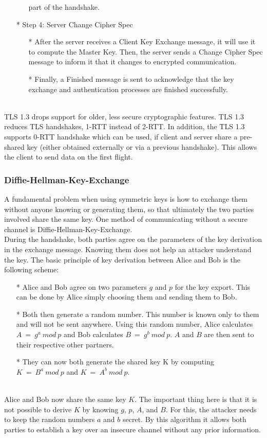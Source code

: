 \begin{enumerate}[]
\begin{enumerate}[]
            part of the handshake.
        \end{enumerate}
    \item[*] Step 4: Server Change Cipher Spec
        \begin{enumerate}[]
            \item[*] After the server receives a Client Key Exchange message, it will use 
            it to compute the Master Key. Then, the server sends a Change Cipher Spec message 
            to inform it that it changes to encrypted communication.
            \item[*] Finally, a Finished message is sent to acknowledge that the key exchange 
            and authentication processes are finished successfully.
        \end{enumerate}
\end{enumerate}
\\
TLS 1.3 drops support for older, less secure cryptographic features. TLS 1.3 reduces 
TLS handshakes, 1-RTT instead of 2-RTT. In addition, the TLS 1.3 supports 0-RTT handshake 
which can be used, if client and server share a pre-shared key (either obtained externally 
or via a previous handshake). This allows the client to send data on the first flight.

\subsubsection{Diﬃe-Hellman-Key-Exchange}\cite{b38}
A fundamental problem when using symmetric keys is how to exchange them without anyone 
knowing or generating them, so that ultimately the two parties involved share the same 
key. One method of communicating without a secure channel is Diﬃe-Hellman-Key-Exchange.
\\
During the handshake, both parties agree on the parameters of the key derivation in the 
exchange message. Knowing them does not help an attacker understand the key. The basic 
principle of key derivation between Alice and Bob is the following scheme:

\begin{enumerate}[]
    \item[*] Alice and Bob agree on two parameters $g$ and $p$ for the key export. This can be done by Alice simply choosing them and sending them to Bob.
    \item[*] Both then generate a random number. This number is known only to them and will not be sent anywhere. Using this random number, Alice calculates $A \ = \ g^a \ mod \ p$ and Bob calculates $B \ = \ g^b \ mod \ p$. 
    $A$ and $B$ are then sent to their respective other partners.
    \item[*] They can now both generate the shared key K by computing $K \ = \ B^a \ mod \ p$ and $K \ = \ A^b \ mod \ p$.
\end{enumerate}
\\
Alice and Bob now share the same key $K$. The important thing here is that it is not possible 
to derive $K$ by knowing $g$, $p$, $A$, and $B$. For this, the attacker needs to keep the random numbers 
$a$ and $b$ secret.
By this algorithm it allows both parties to establish a key over an insecure channel without any prior information.

